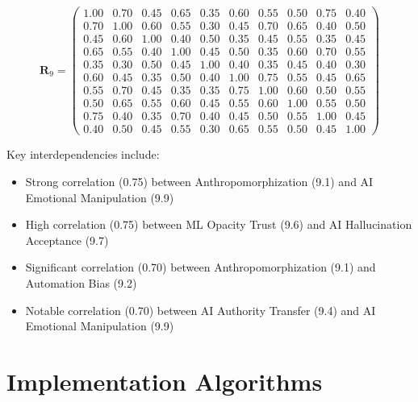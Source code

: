 \documentclass[11pt,a4paper]{article}
\begin{document}
\begin{equation}
\mathbf{R}_9 = \begin{pmatrix}
1.00 & 0.70 & 0.45 & 0.65 & 0.35 & 0.60 & 0.55 & 0.50 & 0.75 & 0.40 \\
0.70 & 1.00 & 0.60 & 0.55 & 0.30 & 0.45 & 0.70 & 0.65 & 0.40 & 0.50 \\
0.45 & 0.60 & 1.00 & 0.40 & 0.50 & 0.35 & 0.45 & 0.55 & 0.35 & 0.45 \\
0.65 & 0.55 & 0.40 & 1.00 & 0.45 & 0.50 & 0.35 & 0.60 & 0.70 & 0.55 \\
0.35 & 0.30 & 0.50 & 0.45 & 1.00 & 0.40 & 0.35 & 0.45 & 0.40 & 0.30 \\
0.60 & 0.45 & 0.35 & 0.50 & 0.40 & 1.00 & 0.75 & 0.55 & 0.45 & 0.65 \\
0.55 & 0.70 & 0.45 & 0.35 & 0.35 & 0.75 & 1.00 & 0.60 & 0.50 & 0.55 \\
0.50 & 0.65 & 0.55 & 0.60 & 0.45 & 0.55 & 0.60 & 1.00 & 0.55 & 0.50 \\
0.75 & 0.40 & 0.35 & 0.70 & 0.40 & 0.45 & 0.50 & 0.55 & 1.00 & 0.45 \\
0.40 & 0.50 & 0.45 & 0.55 & 0.30 & 0.65 & 0.55 & 0.50 & 0.45 & 1.00
\end{pmatrix}
\end{equation}

Key interdependencies include:
\begin{itemize}
\item Strong correlation (0.75) between Anthropomorphization (9.1) and AI Emotional Manipulation (9.9)
\item High correlation (0.75) between ML Opacity Trust (9.6) and AI Hallucination Acceptance (9.7)
\item Significant correlation (0.70) between Anthropomorphization (9.1) and Automation Bias (9.2)
\item Notable correlation (0.70) between AI Authority Transfer (9.4) and AI Emotional Manipulation (9.9)
\end{itemize}

\section{Implementation Algorithms}
\end{document}
